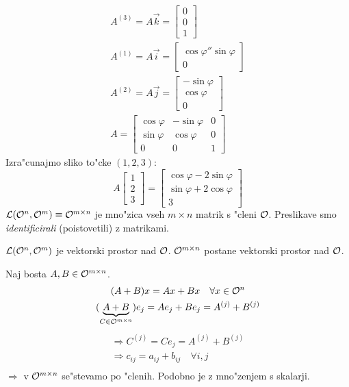 \begin{gather*}
A^{(3)} = A\vec{k} = \begin{bmatrix}0 \\ 0 \\ 1\end{bmatrix} \\
A^{(1)} = A\vec{i} = \begin{bmatrix}\cos \varphi '' \sin \varphi \\ 0 \end{bmatrix} \\
A^{(2)} = A\vec{j} = \begin{bmatrix}- \sin \varphi \\ \cos \varphi \\ 0\end{bmatrix} \\
A = \begin{bmatrix}
\cos \varphi & -\sin \varphi & 0 \\
\sin \varphi & \cos \varphi & 0 \\
0 & 0 & 1
\end{bmatrix}
\end{gather*}
Izra"cunajmo sliko to"cke $(1, 2, 3)$:
\begin{equation*}
A\begin{bmatrix}1 \\ 2 \\ 3\end{bmatrix} = \begin{bmatrix}
\cos \varphi - 2 \sin \varphi \\
\sin \varphi + 2 \cos \varphi \\
3
\end{bmatrix}
\end{equation*}
$\mathcal{L}(\mathcal{O}^n, \mathcal{O}^m) \equiv \mathcal{O}^{m \times n}$ je mno"zica vseh $m \times n$ matrik s "cleni $\mathcal{O}$. Preslikave smo \emph{identificirali} (poistovetili) z matrikami.

$\mathcal{L}(\mathcal{O}^n, \mathcal{O}^m)$ je vektorski prostor nad $\mathcal{O}$. $\mathcal{O}^{m \times n}$ postane vektorski prostor nad $\mathcal{O}$.

Naj bosta $A, B \in \mathcal{O}^{m \times n}$.
\begin{gather*}
(A + B) x = Ax + Bx \quad \forall x \in \mathcal{O}^n \\
(\underbrace{A + B}_{C \in \mathcal{O}^{m\times n}})e_j = Ae_j + Be_j = A^{(j)} + B^{(j)}
\end{gather*}
\begin{gather*}
\Rightarrow C^{(j)} = Ce_j = A^{(j)} + B^{(j)} \\
\Rightarrow c_{ij} = a_{ij} + b_{ij} \quad \forall i,j \\
\end{gather*}
$\Rightarrow$ v $\mathcal{O}^{m \times n}$ se"stevamo po "clenih. Podobno je z mno"zenjem s skalarji.
%
